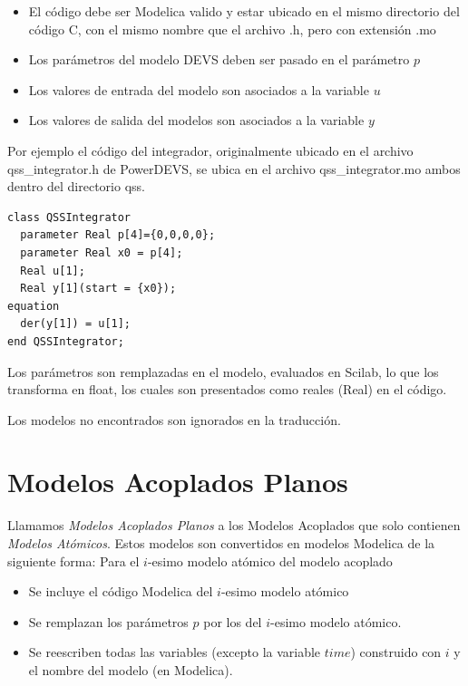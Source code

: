 \documentclass[a4paper,	11pt]{report}
\begin{document}
\begin{itemize}
\item El código debe ser Modelica valido y estar ubicado en el mismo directorio del código C, con el mismo nombre que el archivo .h, pero con extensión .mo
\item Los parámetros del modelo DEVS deben ser pasado en el parámetro $p$
\item Los valores de entrada del modelo son asociados a la variable $u$
\item Los valores de salida del modelos son asociados a la variable $y$
\end{itemize}

Por ejemplo el código del integrador, originalmente ubicado en el archivo qss\_integrator.h de PowerDEVS, se ubica en el archivo qss\_integrator.mo ambos dentro del directorio qss.

\begin{verbatim}
class QSSIntegrator
  parameter Real p[4]={0,0,0,0};
  parameter Real x0 = p[4];
  Real u[1];
  Real y[1](start = {x0});
equation
  der(y[1]) = u[1];
end QSSIntegrator;
\end{verbatim}

Los parámetros son remplazadas en el modelo, evaluados en Scilab, lo que los transforma en float, los cuales son presentados como reales (Real) en el código.

Los modelos no encontrados son ignorados en la traducción.


\section{Modelos Acoplados Planos}

Llamamos \emph{Modelos Acoplados Planos} a los Modelos Acoplados que solo contienen \emph{Modelos Atómicos}. Estos modelos son convertidos en modelos Modelica de la siguiente forma:
Para el $i$-esimo modelo atómico del modelo acoplado
\begin{itemize}
	\item Se incluye el código Modelica del $i$-esimo modelo atómico
	\item Se remplazan los parámetros $p$ por los del $i$-esimo modelo atómico.
	\item Se reescriben todas las variables (excepto la variable $time$) construido con $i$ y el nombre del modelo (en Modelica).
\end{itemize}
\end{document}
